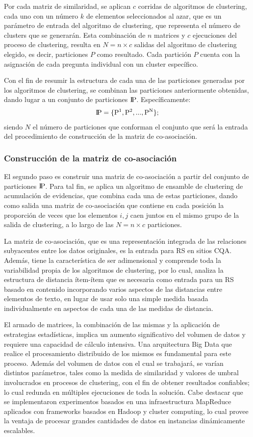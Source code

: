 \bigskip Por cada matriz de similaridad, se aplican \(c\) corridas de algoritmos de clustering, cada uno con un número \(k\) de elementos seleccionados al azar, que es un parámetro de entrada del algoritmo de clustering, que representa el número de clusters que se generarán. Esta combinación de \(n\) matrices y \(c\) ejecuciones del proceso de clustering, resulta en \(N = n \times c\) salidas del algoritmo de clustering elegido, es decir, particiones \(P\) como resultado. Cada partición \(P\) cuenta con la asignación de cada pregunta individual con un cluster específico.

\bigskip Con el fin de resumir la estructura de cada una de las particiones generadas por los algoritmos de clustering, se combinan las particiones anteriormente obtenidas, dando lugar a un conjunto de particiones \(\rm I\!P\). Específicamente:
\[\rm I\!P = \{P^1, P^2, ..., P^N\};\]
siendo \(N\) el número de particiones que conforman el conjunto que será la entrada del procedimiento de construcción de la matriz de co-asociación.

\subsubsection{Construcción de la matriz de co-asociación}
El segundo paso es construir una matriz de co-asociación a partir del conjunto de particiones \(\rm I\!P\). Para tal fin, se aplica un algoritmo de ensamble de clustering de acumulación de evidencias, que combina cada una de estas particiones, dando como salida una matriz de co-asociación que contiene en cada posición la proporción de veces que los elementos \(i,j\) caen juntos en el mismo grupo de la salida de clustering, a lo largo de las \(N=n \times c\) particiones.

\bigskip La matriz de co-asociación, que es una representación integrada de las relaciones subyacentes entre los datos originales, es la entrada para RS en sitios CQA. Además, tiene la característica de ser adimensional y comprende toda la variabilidad propia de los algoritmos de clustering, por lo cual, analiza la estructura de distancia ítem-ítem que es necesaria como entrada para un RS basado en contenido incorporando varios aspectos de las distancias entre elementos de texto, en lugar de usar solo una simple medida basada individualmente en aspectos de cada una de las medidas de distancia.

\bigskip El armado de matrices, la combinación de las mismas y la aplicación de estrategias estadísticas, implica un aumento significativo del volumen de datos y requiere una capacidad de cálculo intensiva. Una arquitectura Big Data que realice el procesamiento distribuido de los mismos es fundamental para este proceso. Además del volumen de datos con el cual se trabajará, se varían distintos parámetros, tales como la medida de similaridad y valores de umbral involucrados en procesos de clustering, con el fin de obtener resultados confiables; lo cual redunda en múltiples ejecuciones de toda la solución. Cabe destacar que se implementaron experimentos basados en una infraestructura MapReduce aplicados con frameworks basados en Hadoop y cluster computing, lo cual provee la ventaja de procesar grandes cantidades de datos en instancias dinámicamente escalables.